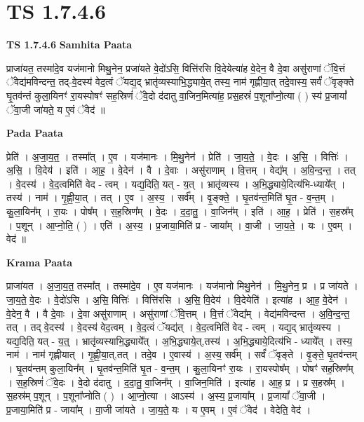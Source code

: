 \documentclass[17pt]{extarticle}
\begin{document}
\section{ TS 1.7.4.6 }

\textbf{TS 1.7.4.6 } \newline
\textbf{Samhita Paata} \newline

प्राजा॑यत॒ तस्मा॑दे॒व यज॑मानो मिथु॒नेन॒ प्रजा॑यते वे॒दो॑ऽसि॒ वित्ति॑रसि वि॒देयेत्या॑ह वे॒देन॒ वै दे॒वा असु॑राणां ॅवि॒त्तं ॅवेद्य॑मविन्दन्त॒ तद्-वे॒दस्य॑ वेद॒त्वं ॅयद्य॒द् भ्रातृ॑व्यस्याभि॒द्ध्याये॒त् तस्य॒ नाम॑ गृह्णीया॒त् तदे॒वास्य॒ सर्वं॑ ॅवृङ्क्ते घृ॒तव॑न्तं कुला॒यिनꣳ॑ रा॒यस्पोषꣳ॑ सह॒स्रिणं॑ ॅवे॒दो द॑दातु वा॒जिन॒मित्या॑ह॒ प्रस॒हस्रं॑ प॒शूना᳚प्नो॒त्या ( ) स्य॑ प्र॒जायां᳚ ॅवा॒जी जा॑यते॒ य ए॒वं ॅवेद॑ ॥ \newline

\textbf{Pada Paata} \newline

प्रेति॑ । अ॒जा॒य॒त॒ । तस्मा᳚त् । ए॒व । यज॑मानः । मि॒थु॒नेन॑ । प्रेति॑ । जा॒य॒ते॒ । वे॒दः । अ॒सि॒ । वित्तिः॑ । अ॒सि॒ । वि॒देय॑ । इति॑ । आ॒ह॒ । वे॒देन॑ । वै । दे॒वाः । असु॑राणाम् । वि॒त्तम् । वेद्य᳚म् । अ॒वि॒न्द॒न्त॒ । तत् । वे॒दस्य॑ । वे॒द॒त्वमिति॑ वेद - त्वम् । यद्य॒दिति॒ यत् - य॒त् । भ्रातृ॑व्यस्य । अ॒भि॒द्ध्याये॒दित्य॑भि-ध्याये᳚त् । तस्य॑ । नाम॑ । गृ॒ह्णी॒या॒त् । तत् । ए॒व । अ॒स्य॒ । सर्व᳚म् । वृ॒ङ्क्ते॒ । घृ॒तव॑न्त॒मिति॑ घृ॒त - व॒न्त॒म् । कु॒ला॒यिन᳚म् । रा॒यः । पोष᳚म् । स॒ह॒स्रिण᳚म् । वे॒दः । द॒दा॒तु॒ । वा॒जिन᳚म् । इति॑ । आ॒ह॒ । प्रेति॑ । स॒हस्र᳚म् । प॒शून् । आ॒प्नो॒ति॒ ( ) । एति॑ । अ॒स्य॒ । प्र॒जाया॒मिति॑ प्र - जाया᳚म् । वा॒जी । जा॒य॒ते॒ । यः । ए॒वम् । वेद॑ ॥  \newline


\textbf{Krama Paata} \newline

प्राजा॑यत । अ॒जा॒य॒त॒ तस्मा᳚त् । तस्मा॑दे॒व । ए॒व यज॑मानः । यज॑मानो मिथु॒नेन॑ । मि॒थु॒नेन॒ प्र । प्र जा॑यते । जा॒य॒ते॒ वे॒दः । वे॒दो॑ऽसि । अ॒सि॒ वित्तिः॑ । वित्ति॑रसि । अ॒सि॒ वि॒देय॑ । वि॒देयेति॑ । इत्या॑ह । आ॒ह॒ वे॒देन॑ । वे॒देन॒ वै । वै दे॒वाः । दे॒वा असु॑राणाम् । असु॑राणां ॅवि॒त्तम् । वि॒त्तं ॅवेद्य᳚म् । वेद्य॑मविन्दन्त । अ॒वि॒न्द॒न्त॒ तत् । तद् वे॒दस्य॑ । वे॒दस्य॑ वेद॒त्वम् । वे॒द॒त्वं ॅयद्य॑त् । वे॒द॒त्वमिति॑ वेद - त्वम् । यद्य॒द् भ्रातृ॑व्यस्य । यद्य॒दिति॒ यत् - य॒त्॒ । भ्रातृ॑व्यस्याभि॒द्ध्याये᳚त् । अ॒भि॒द्ध्याये॒त्,तस्य॑ । अ॒भि॒द्ध्याये॒दित्य॑भि - ध्याये᳚त् । तस्य॒ नाम॑ । नाम॑ गृह्णीयात् । गृ॒ह्णी॒या॒त्,तत् । तदे॒व । ए॒वास्य॑ । अ॒स्य॒ सर्व᳚म् । सर्वं॑ ॅवृङ्ते । वृ॒ङ्ते॒ घृ॒तव॑न्तम् । घृ॒तव॑न्तम् कुला॒यिन᳚म् । घृ॒तव॑न्त॒मिति॑ घृ॒त - व॒न्त॒म् । कु॒ला॒यिनꣳ॑ रा॒यः । रा॒यस्पोष᳚म् । पोषꣳ॑ सह॒स्रिण᳚म् । स॒ह॒स्रिणं॑ ॅवे॒दः । वे॒दो द॑दातु । द॒दा॒तु॒ वा॒जिन᳚म् । वा॒जिन॒मिति॑ । इत्या॑ह । आ॒ह॒ प्र । प्र स॒हस्र᳚म् । स॒हस्र॑म् प॒शून् । प॒शूना᳚प्नोति ( ) । आ॒प्नो॒त्या । आऽस्य॑ । अ॒स्य॒ प्र॒जाया᳚म् । प्र॒जायां᳚ ॅवा॒जी । प्र॒जाया॒मिति॑ प्र - जाया᳚म् । वा॒जी जा॑यते । जा॒य॒ते॒ यः । य ए॒वम् । ए॒वं ॅवेद॑ । वेदेति॒ वेद॑ । \newline
\end{document}
